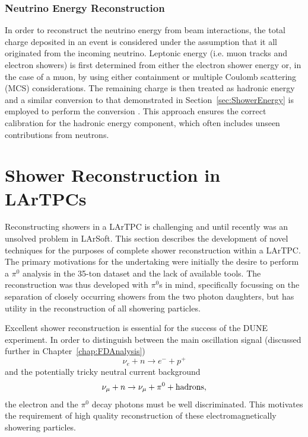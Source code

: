 \subsubsection{Neutrino Energy Reconstruction}\label{sec:NeutrinoEnergy}

In order to reconstruct the neutrino energy from beam interactions, the total charge deposited in an event is considered under the assumption that it all originated from the incoming neutrino.  Leptonic energy (i.e. muon tracks and electron showers) is first determined from either the electron shower energy or, in the case of a muon, by using either containment or multiple Coulomb scattering (MCS) considerations.  The remaining charge is then treated as hadronic energy and a similar conversion to that demonstrated in Section~\ref{sec:ShowerEnergy} is employed to perform the conversion \cite{Grant2017}.  This approach ensures the correct calibration for the hadronic energy component, which often includes unseen contributions from neutrons.

\section{Shower Reconstruction in LArTPCs}\label{sec:ShowerReconstruction}

Reconstructing showers in a LArTPC is challenging and until recently was an unsolved problem in LArSoft.  This section describes the development of novel techniques for the purposes of complete shower reconstruction within a LArTPC.  The primary motivations for the undertaking were initially the desire to perform a $\pi^0$ analysis in the 35-ton dataset and the lack of available tools.  The reconstruction was thus developed with $\pi^0$s in mind, specifically focussing on the separation of closely occurring showers from the two photon daughters, but has utility in the reconstruction of all showering particles.

Excellent shower reconstruction is essential for the success of the DUNE experiment.  In order to distinguish between the main oscillation signal (discussed further in Chapter~\ref{chap:FDAnalysis})
\begin{equation}
  \nu_e + n \rightarrow e^- + p^+
\end{equation}
and the potentially tricky neutral current background
\begin{equation}
  \nu_{\mu} + n \rightarrow \nu_{\mu} + \pi^0 + \textnormal{hadrons},
\end{equation}
the electron and the $\pi^0$ decay photons must be well discriminated.  This motivates the requirement of high quality reconstruction of these electromagnetically showering particles.

